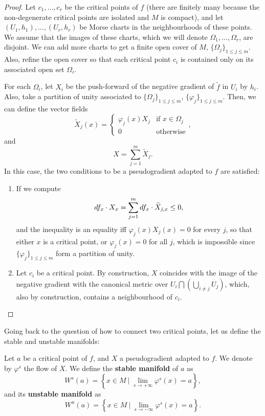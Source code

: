\begin{proof}
Let $c_1,...,c_r$ be the critical points of $f$ (there are finitely many because the non-degenerate critical points are isolated and $M$ is compact), and let $(U_1,h_1),...,(U_r,h_r)$ be Morse charts in the neighbourhoods of these points. We assume that the images of these charts, which we will denote $\Omega_1,...,\Omega_r$, are disjoint. We can add more charts to get a finite open cover of $M$, $\{\Omega_j\}_{1 \leq j \leq m}$. Also, refine the open cover so that each critical point $c_i$ is contained only on its associated open set $\Omega_i$.

For each $\Omega_i$, let $X_i$ be the push-forward of the negative gradient of $\tilde{f}$ in $U_i$ by $h_i$. Also, take a partition of unity associated to $\{\Omega_j\}_{1 \leq j \leq m}$, $\{\varphi_j\}_{1 \leq j \leq m}$. Then, we can define the vector fields
$$\widetilde{X}_j(x) = \left\{ \begin{array}{ll} \varphi_j(x) X_j & \text{if } x \in \Omega_j \\ 0 & \text{otherwise} \end{array} \right. ,$$
and
$$X = \sum_{j=1}^m \widetilde{X}_j .$$
In this case, the two conditions to be a pseudogradient adapted to $f$ are satisfied:

\begin{enumerate}
\item If we compute
$$\\d f_x \cdot X_x = \sum_{j=1}^m \\d f_x \cdot \widetilde{X}_{j,x} \leq 0 ,$$
and the inequality is an equality iff $\varphi_j(x) X_j(x) = 0$ for every $j$, so that either $x$ is a critical point, or $\varphi_j(x)=0$ for all $j$, which is impossible since $\{\varphi_j\}_{1\leq j \leq m}$ form a partition of unity.
\item Let $c_i$ be a critical point. By construction, $X$ coincides with the image of the negative gradient with the canonical metric over $U_i \bigcap \left( \bigcup_{i \neq j} U_j\right)$, which, also by construction, contains a neighbourhood of $c_i$.
\end{enumerate}
\end{proof}

Going back to the question of how to connect two critical points, let us define the stable and unstable manifolds:

\begin{deff}
Let $a$ be a critical point of $f$, and $X$ a pseudogradient adapted to $f$. We denote by $\varphi^s$ the flow of $X$. We define the {\bf stable manifold} of $a$ as
$$W^s(a) = \left\{ x \in M \ | \ \lim_{s \rightarrow + \infty} \varphi^s(x) = a \right\}, $$
and its {\bf unstable manifold} as
$$W^u(a) = \left\{ x \in M \ | \ \lim_{s \rightarrow - \infty} \varphi^s(x) = a \right\} .$$
\end{deff}

